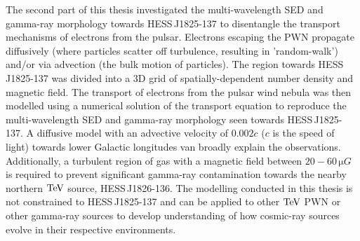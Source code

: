 The second part of this thesis investigated the multi-wavelength SED and gamma-ray morphology towards \mbox{HESS\,J1825-137} to disentangle the transport mechanisms of electrons from the pulsar. Electrons escaping the PWN propagate diffusively (where particles scatter off turbulence, resulting in 'random-walk') and/or via advection (the bulk motion of particles). The region towards \mbox{HESS\,J1825-137} was divided into a 3D grid of spatially-dependent number density and magnetic field. The transport of electrons from the pulsar wind nebula was then modelled using a numerical solution of the transport equation to reproduce the multi-wavelength SED and gamma-ray morphology seen towards \mbox{HESS\,J1825-137}. A diffusive model with an advective velocity of $0.002c$ ($c$ is the speed of light) towards lower Galactic longitudes van broadly explain the observations. Additionally, a turbulent region of gas with a magnetic field between $20-60\,\si{\micro G}$ is required to prevent significant gamma-ray contamination towards the nearby northern $\TeV$ source, \mbox{HESS\,J1826-136}.
\newpar
The modelling conducted in this thesis is not constrained to \mbox{HESS\,J1825-137} and can be applied to other $\TeV$ PWN or other gamma-ray sources to develop understanding of how cosmic-ray sources evolve in their respective environments.